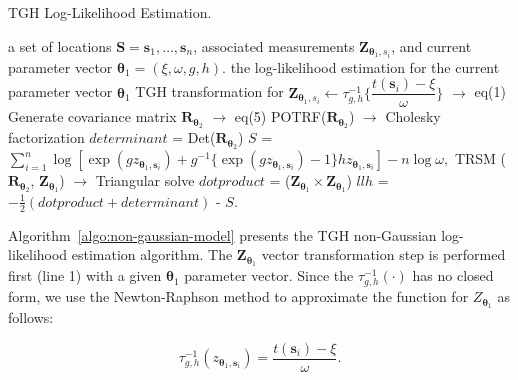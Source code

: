\documentclass[conference]{IEEEtran}
\begin{document}
\begin{algorithm}[H]

\caption{TGH Log-Likelihood Estimation.}
\label{algo:non-gaussian-model}
\begin{algorithmic}[1]
 a set of locations $\bm{S} = \bm s_1,\ldots,\bm s_n$,   associated measurements $\bm{Z}_{\bm{\theta}_1,s_i}$, and current parameter vector $\bm{\theta}_1= (\xi, \omega, g, h)$.
 the log-likelihood estimation for the current parameter vector $\bm{\theta}_1$
\STATE TGH transformation for $\bm{Z}_{\bm{\theta}_1,s_i} \leftarrow \tau_{g,h}^{-1} \bigg \{ \dfrac{t(\bm{s}_i) - \xi}{\omega} \bigg \}$ $\rightarrow$ eq(1)
\STATE  Generate covariance matrix $\bm{R}_{\bm{\theta}_2}$
$\rightarrow$ eq(5)
\STATE  POTRF($\bm{R}_{\bm{\theta}_2}$)  $\rightarrow$ Cholesky factorization
\STATE $determinant$ = Det($\bm{R}_{\bm{\theta}_2}$)
\STATE $S$ =  $\sum_{i=1}^n \log [ \exp(g z_{\bm{\theta}_1,\bm{s}_i})+g^{-1} \{ \exp(g z_{\bm{\theta}_1,\bm{s}_i}) -1 \} h z_{\bm{\theta}_1,\bm{s}_i}] -n \log \omega, $
\STATE TRSM ($\bm{R}_{\bm{\theta}_2}$, $\bm{Z}_{\bm{\theta}_1}$) $\rightarrow$ Triangular solve
\STATE  $dotproduct$ = (${\bm{Z}_{\bm{\theta}_1}}\times  \bm{Z}_{\bm{\theta}_1}$)
\STATE $llh$ = $-\frac{1}{2} (dotproduct + determinant)$ - $S$.


\end{algorithmic}
\end{algorithm}

Algorithm~\ref{algo:non-gaussian-model} presents the
TGH non-Gaussian log-likelihood estimation algorithm. 
The $\bm{Z}_{\bm{\theta}_1}$ vector transformation step
is performed first (line 1) with a given $\bm{\theta}_1$ parameter vector. Since the $\tau_{g,h}^{-1}(\cdot)$ has
no closed form, we use the Newton-Raphson method to
approximate the function for $Z_{\bm{\theta}_1}$ as follows:

\begin{equation}
\label{eq:newton}
\tau_{g,h}^{-1}(z_{\bm{\theta}_1, \bm{s}_i}) = \frac{t(\bm{s}_i) -\xi}{\omega}.
\end{equation}

%
\end{document}
